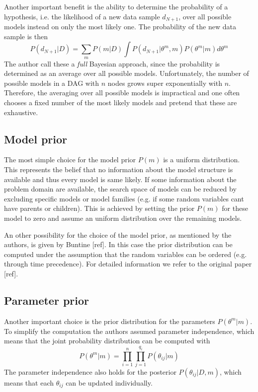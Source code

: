 \documentclass{article}
\begin{document}
	Another important benefit is the ability to determine the probability of a hypothesis,
	i.e. the likelihood of a	new data sample $d_{N+1}$, over all possible models
	instead on only the most likely one. The probability of the new data sample is then
	\[
		P(d_{N+1}|D)=\sum_m P(m|D)\int P(d_{N+1}|\theta^m,m)P(\theta^m|m)d\theta^m
	\]
	The author call these a \textit{full} Bayesian approach, since the probability is determined as an average
	over all possible models. Unfortunately, the number of possible models in a DAG with $n$ nodes grows
	super exponentially with $n$. Therefore, the averaging over all possible models is impractical and
	one often chooses a fixed number of the most likely models and pretend that these are exhaustive.
	
	\subsection{Model prior}
	The most simple choice for the model prior $P(m)$ is a uniform distribution. This represents 
	the belief that no information about the model structure is	available and thus every 
	model is same likely. If some information about the problem domain are available, the search space 
	of models can be reduced by excluding specific models or model families (e.g. if some random
	variables cant have parents or children). This is achieved by setting
	the prior $P(m)$ for these model to zero and assume an uniform distribution over the remaining
	models.	
	
	An other possibility for the choice of the model prior, as mentioned by the authors, is given
	by Buntine [ref]. In this case the prior distribution can be computed under the assumption that
	the random variables can be ordered (e.g. through time precedence). For detailed information we
	refer to the original paper [ref].
	
	\subsection{Parameter prior}
	Another important choice is the prior distribution for the parameters $P(\theta^m|m)$. To simplify
	the computation the authors assumed parameter independence, which means that the joint probability
	distribution can be computed with
	\[
		P(\theta^m|m)= \prod_{i=1}^n \prod_{j=1}^{q_i} P(\theta_{ij}|m)
	\]
	The parameter independence also holds for the posterior $P(\theta_{ij}|D,m)$, which means
	that each $\theta_{ij}$ can be updated individually.
	
\end{document}
